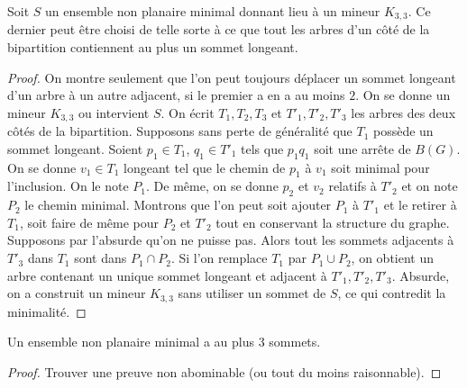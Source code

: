 \documentclass{scrartcl}
\begin{document}
\begin{flushleft}
\begin{lem}\label{normalformK33}
    Soit $S$ un ensemble non planaire minimal donnant lieu à un mineur $K_{3,3}$. Ce dernier
    peut être choisi de telle sorte à ce que tout les arbres d'un côté de la bipartition
    contiennent au plus un sommet longeant.
\end{lem}

\begin{proof}
    On montre seulement que l'on peut toujours déplacer un sommet longeant d'un arbre à un
    autre adjacent, si le premier a en a au moins $2$. On se donne un mineur $K_{3,3}$ ou
    intervient $S$. On écrit $T_1, T_2, T_3$ et $T'_1, T'_2, T'_3$ les arbres des deux côtés
    de la bipartition. Supposons sans perte de généralité que $T_1$ possède un sommet longeant.
    Soient $p_1 \in T_1$, $q_1 \in T'_1$ tels que $p_1q_1$ soit une arrête de $B(G)$. On se
    donne $v_1 \in T_1$ longeant tel que le chemin de $p_1$ à $v_1$ soit minimal pour
    l'inclusion. On le note $P_1$. De même, on se donne $p_2$ et $v_2$ relatifs à $T'_2$ et
    on note $P_2$ le chemin minimal.
    \medskip \newline
    Montrons que l'on peut soit ajouter $P_1$ à $T'_1$ et le retirer à $T_1$, soit
    faire de même pour $P_2$ et $T'_2$ tout en conservant la structure du graphe. Supposons
    par l'absurde qu'on ne puisse pas. Alors tout les sommets adjacents à $T'_3$ dans $T_1$
    sont dans $P_1 \cap P_2$. Si l'on remplace $T_1$ par $P_1 \cup P_2$, on obtient un arbre
    contenant un unique sommet longeant et adjacent à $T'_1, T'_2, T'_3$. Absurde,
    on a construit un mineur $K_{3,3}$ sans utiliser un sommet de $S$, ce qui contredit la
    minimalité.
\end{proof}


\begin{lem}\label{minimalmax3}
    Un ensemble non planaire minimal a au plus $3$ sommets.
\end{lem}

\begin{proof}
    Trouver une preuve non abominable (ou tout du moins raisonnable).
\end{proof}


\end{flushleft}
\end{document}
